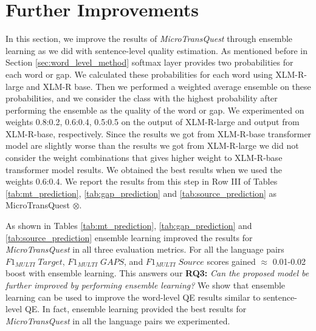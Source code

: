 \section{Further Improvements}
\label{sec:word_level_finetune}
In this section, we improve the results of \textit{MicroTransQuest} through ensemble learning as we did with sentence-level quality estimation. As mentioned before in Section \ref{sec:word_level_method} softmax layer provides two probabilities for each word or gap. We calculated these probabilities for each word using XLM-R-large and XLM-R base. Then we performed a weighted average ensemble on these probabilities, and we consider the class with the highest probability after performing the ensemble as the quality of the word or gap. We experimented on weights 0.8:0.2, 0.6:0.4, 0.5:0.5 on the output of XLM-R-large and output from XLM-R-base, respectively. Since the results we got from XLM-R-base transformer model are slightly worse than the results we got from XLM-R-large we did not consider the weight combinations that gives higher weight to XLM-R-base transformer model results. We obtained the best results when we used the weights 0.6:0.4. We report the results from this step in Row III of Tables \ref{tab:mt_prediction}, \ref{tab:gap_prediction} and \ref{tab:source_prediction} as MicroTransQuest $\otimes$.

As shown in Tables \ref{tab:mt_prediction}, \ref{tab:gap_prediction} and \ref{tab:source_prediction} ensemble learning improved the results for \textit{MicroTransQuest} in all three evaluation metrics. For all the language pairs $F1_{\textit{MULTI}} \; Target$, $F1_{\textit{MULTI}} \; GAPS$, and $F1_{\textit{MULTI}} \; Source$ scores gained $\approx$ 0.01-0.02 boost with ensemble learning. This answers our \textbf{RQ3:} \textit{Can the proposed model be further improved by performing ensemble learning?} We show that ensemble learning can be used to improve the word-level QE results similar to sentence-level QE. In fact, ensemble learning provided the best results for \textit{MicroTransQuest} in all the language pairs we experimented.

